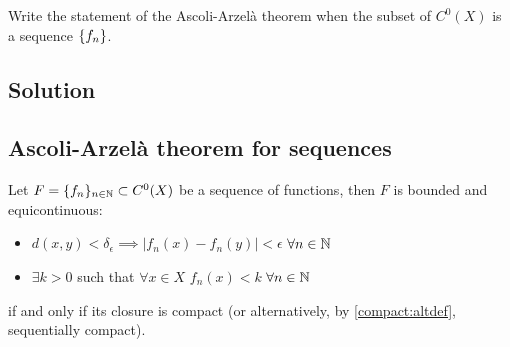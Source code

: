 
\question
Write the statement of the Ascoli-Arzelà theorem when the subset of $C^0(X)$ is a sequence $\{ f_n \}$.

\subsection*{Solution}

\subsection{Ascoli-Arzelà theorem for sequences}
Let $F=\{f_n\}_{n\in\mathbb{N}} \subset C^0(X)$ be a sequence of functions, then $F$ is bounded and equicontinuous:
\begin{itemize}
    \item $d(x,y)<\delta_\epsilon \implies |f_n(x) - f_n(y)| < \epsilon $ $\forall n \in \mathbb{N}$
    \item $\exists k > 0$ such that $\forall x \in X$ $f_n(x)<k$ $\forall n \in \mathbb{N}$
\end{itemize}
if and only if its closure is compact (or alternatively, by \ref{compact:altdef}, sequentially compact).\\
